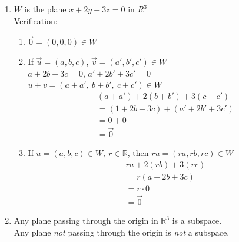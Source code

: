 \documentclass[]{article}
\begin{document}
		\begin{enumerate}
			\item $W$ is the plane $x+2y+3z=0$ in $R^3$\\
			Verification:
			\begin{enumerate}
				\item $\vec{0}=(0,0,0)\in W$
				\item If $\vec{u}=(a,b,c)$, $\vec{v}=(a',b',c')\in W$\\
				$a+2b+3c=0$, $a'+2b'+3c'=0$\\
				$u+v=(a+a',~b+b',~c+c')\in W$\\
				\begin{align*}
					&(a+a')+2(b+b')+3(c+c')\\
					&=(1+2b+3c)+(a'+2b'+3c')\\
					&=0+0\\
					&=\vec{0}			
				\end{align*}
				\item If $u=(a,b,c)\in W,~r\in\mathbb{R}$, then $ru=(ra,rb,rc)\in W$\\
				\begin{align*}
					&ra+2(rb)+3(rc)\\
					&=r(a+2b+3c)\\
					&=r\cdot 0\\
					&=\vec{0}
				\end{align*}
			\end{enumerate}
		
			\item Any plane passing through the origin in $\mathbb{R}^3$ is a subspace.\\
			Any plane \emph{not} passing through the origin is \emph{not} a subspace.\\
			

\end{enumerate}
\end{document}
